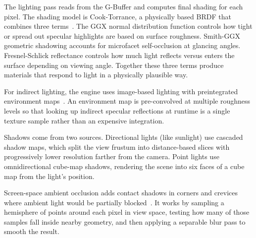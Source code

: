 \documentclass[9pt,openany]{extbook}
\begin{document}
The lighting pass reads from the G-Buffer and computes final shading for each pixel. The shading model is Cook-Torrance, a physically based BRDF that combines three terms~\cite{cook1982,walter2007,kajiya1986}. The GGX normal distribution function controls how tight or spread out specular highlights are based on surface roughness. Smith-GGX geometric shadowing accounts for microfacet self-occlusion at glancing angles. Fresnel-Schlick reflectance controls how much light reflects versus enters the surface depending on viewing angle. Together these three terms produce materials that respond to light in a physically plausible way.

For indirect lighting, the engine uses image-based lighting with preintegrated environment maps~\cite{debevec1998}. An environment map is pre-convolved at multiple roughness levels so that looking up indirect specular reflections at runtime is a single texture sample rather than an expensive integration.

Shadows come from two sources. Directional lights (like sunlight) use cascaded shadow maps, which split the view frustum into distance-based slices with progressively lower resolution farther from the camera. Point lights use omnidirectional cube-map shadows, rendering the scene into six faces of a cube map from the light's position.

Screen-space ambient occlusion adds contact shadows in corners and crevices where ambient light would be partially blocked~\cite{kajalin2009}. It works by sampling a hemisphere of points around each pixel in view space, testing how many of those samples fall inside nearby geometry, and then applying a separable blur pass to smooth the result.
\end{document}
